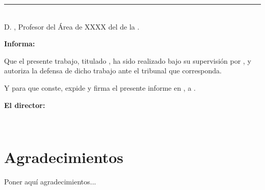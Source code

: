 \noindent\rule[-1ex]{\textwidth}{2pt}\\[4.5ex]

D. \textbf{\myProf}, Profesor del Área de XXXX del \myDepartment de la \myUni.

\vspace{0.5cm}

\textbf{Informa:}

\vspace{0.5cm}

Que el presente trabajo, titulado \textit{\textbf{\myTitle}}, ha sido realizado bajo su supervisión 
por \textbf{\myName}, y autoriza la defensa de dicho trabajo ante el tribunal que corresponda.

\vspace{0.5cm}

Y para que conste, expide y firma el presente informe en \myLocation, a \myTime.

\vspace{1cm}

\textbf{El director:}

\vspace{5cm}

\noindent \textbf{\myProf\\}

\chapter*{Agradecimientos}
\thispagestyle{empty}

       \vspace{1cm}


Poner aquí agradecimientos...

